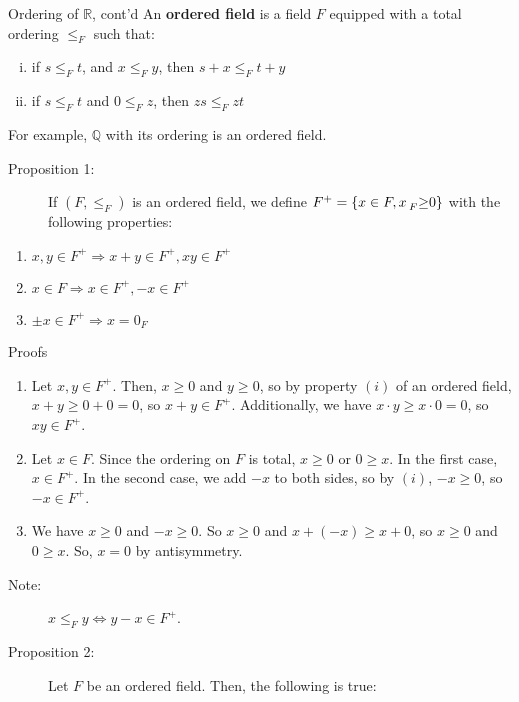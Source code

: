 \documentclass[10pt]{extarticle}
\newcommand{\Q}{\mathbb{Q}}
\newcommand{\R}{\mathbb{R}}
\begin{document}
  \begin{problem}{Ordering of $\R$, cont'd}
    An \textbf{ordered field} is a field $F$ equipped with a total ordering $\leq_{F}$ such that:
    \begin{enumerate}[(i)]
      \item if $s\leq_{F} t$, and $x\leq_{F} y$, then $s + x \leq_{F} t + y$
      \item if $s\leq_{F} t$ and $0\leq_{F} z$, then $zs\leq_{F} zt$
    \end{enumerate}
    For example, $\Q$ with its ordering is an ordered field.\\
    \begin{description}
      \item[Proposition 1:] If $(F,\leq_F)$ is an ordered field, we define $F^+ = \{x\in F,x\prescript{}{F}\geq 0\}$ with the following properties:
    \end{description}
    \begin{enumerate}[(1)]
      \item $x,y\in F^+ \Rightarrow x+y\in F^+,xy\in F^+$
      \item $x\in F \Rightarrow x\in F^+,-x\in F^+$
      \item $\pm x\in F^+ \Rightarrow x = 0_F$
    \end{enumerate}
    \begin{problem}{Proofs}
      \begin{enumerate}[(1)]
        \item Let $x,y\in F^+$. Then, $x\geq 0$  and $y\geq 0$, so by property $(i)$ of an ordered field, $x+y\geq 0+0 = 0$, so $x+y\in F^+$. Additionally, we have $x\cdot y \geq x\cdot 0 = 0$, so $xy \in F^+$.
        \item Let $x\in F$. Since the ordering on $F$ is total, $x \geq 0$ or $0\geq x$. In the first case, $x\in F^+$. In the second case, we add $-x$ to both sides, so by $(i)$, $-x\geq 0$, so $-x\in F^+$.
        \item We have $x\geq 0$  and $-x\geq 0$. So $x \geq 0$ and $x + (-x) \geq x+0$, so $x\geq 0$ and $0\geq x$. So, $x = 0$ by antisymmetry.
      \end{enumerate}
    \end{problem}
    \begin{description}
      \item[Note:] $x\leq_F y \Leftrightarrow y-x\in F^+$.
    \end{description}
    \begin{description}
      \item[Proposition 2:] Let $F$ be an ordered field. Then, the following is true:

\end{description}
\end{problem}
\end{document}
